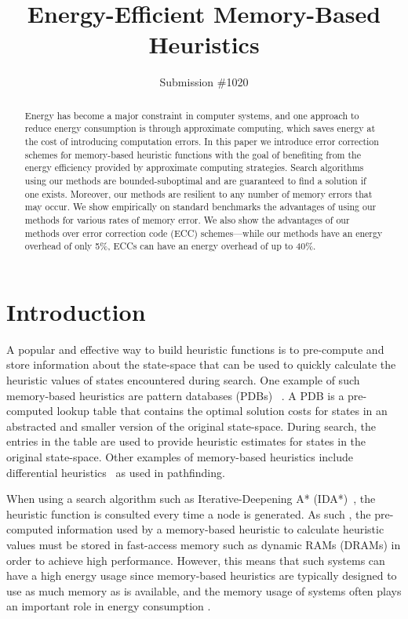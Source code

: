 \documentclass{article}
\title{Energy-Efficient Memory-Based Heuristics}
\author{Submission \#1020}
\begin{document}
\maketitle

\begin{abstract}
Energy has become a major constraint in computer systems, and one approach to reduce energy consumption is through approximate computing, which saves energy at the cost of introducing computation errors. In this paper we introduce error correction schemes for memory-based heuristic functions with the goal of benefiting from the energy efficiency provided by approximate computing strategies. Search algorithms using our methods are bounded-suboptimal and are guaranteed to find a solution if one exists. Moreover, our methods are resilient to any number of memory errors that may occur. We show empirically on standard benchmarks the advantages of using our methods for various rates of memory error. We also show the advantages of our methods over error correction code (ECC) schemes---while our methods have an energy overhead of only 5\%, ECCs can have an energy overhead of up to 40\%. 
\end{abstract}


\section{Introduction}

A popular and effective way to build heuristic functions is to pre-compute and store information about the state-space that can be used to quickly calculate the heuristic values of states encountered during search. One example of such memory-based heuristics are pattern databases (PDBs) ~\cite{culberson1998patternDatabases,Edelkamp01planningwith}. A PDB is a pre-computed lookup table that contains the optimal solution costs for states in an abstracted and smaller version of the original state-space. During search, the entries in the table are used to provide heuristic estimates for states in the original state-space. Other examples of memory-based heuristics include differential heuristics~\cite{stutervant2009memoryBased} as used in pathfinding. %

When using a search algorithm such as Iterative-Deepening A* (IDA*)~\cite{korf85}, the heuristic function is consulted every time a node is generated. As such , the pre-computed information used by a memory-based heuristic to calculate heuristic values must be stored in fast-access memory such as dynamic RAMs (DRAMs) in order to achieve high performance. However, this means that such systems can have a high energy usage since memory-based heuristics are typically designed to use as much memory as is available, and the memory usage of systems often plays an important role in energy consumption \cite{5695550}.
\end{document}
